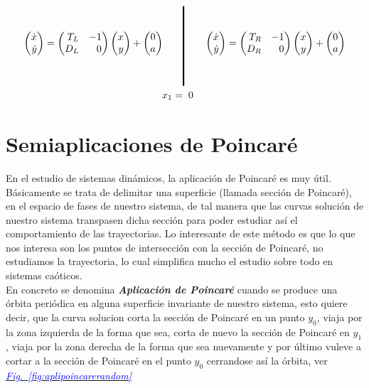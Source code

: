 \documentclass[12pt,a4paper]{report} %
\newcommand{\fref}[1]{\hyperref[#1]{\textcolor{blue}{\textit{Fig.~\ref*{#1}}}}}
\begin{document}
	\begin{equation}
		\label{eq:lienardrlgr}
		\begin{aligned}
			\begin{pmatrix*}[r]
				\dot{x}\\ \dot{y}
			\end{pmatrix*}= \begin{pmatrix*}[r]
				T_L & -1 \\ D_L & 0
			\end{pmatrix*} \begin{pmatrix*}[r]
				x \\ y
			\end{pmatrix*}+\begin{pmatrix*}[c]
				0 \\ a
			\end{pmatrix*} \qquad 
			&\rule[-40pt]{1.5pt}{80pt} \qquad 
			\begin{pmatrix*}[r]
				\dot{x}\\ \dot{y}
			\end{pmatrix*}= \begin{pmatrix*}[r]
				T_R & -1 \\ D_R & 0
			\end{pmatrix*} \begin{pmatrix*}[r]
				x \\ y
			\end{pmatrix*}+\begin{pmatrix*}[c]
				0 \\ a
			\end{pmatrix*} \\ x_1=&\;\;0
		\end{aligned}
	\end{equation}\smallskip
	
	\newpage
	
	\chapter{Semiaplicaciones de Poincaré}
	En el estudio de sistemas dinámicos, la aplicación de Poincaré es muy útil. Básicamente se trata de delimitar una superficie (llamada sección de Poincaré), en el espacio de fases de nuestro sistema, de tal manera que las curvas solución de nuestro sistema transpasen dicha sección para poder estudiar así el comportamiento de las trayectorias. Lo interesante de este método es que lo que nos interesa son los puntos de intersección con la sección de Poincaré, no estudiamos la trayectoria, lo cual simplifica mucho el estudio sobre todo en sistemas caóticos.\\[0.5cm]
	En concreto se denomina \textit{\textbf{Aplicación de Poincaré}} cuando se produce una órbita periódica en alguna superficie invariante de nuestro sistema, esto quiere decir, que la curva solucion corta la sección de Poincaré en un punto $y_0$, viaja por la zona izquierda de la forma que sea, corta de nuevo la sección de Poincaré en $y_1$, viaja por la zona derecha de la forma que sea nuevamente y por último vuleve a cortar a la sección de Poincaré en el punto $y_0$ cerrandose así la órbita, ver \fref{fig:aplipoincarerandom}
	
\end{document}
